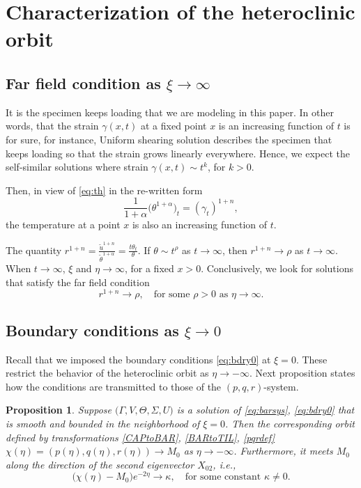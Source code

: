 \documentclass[a4paper,11pt]{article}
\def\tth{{\tilde{\theta}}}
\def\tu{{\tilde{u}}}
\newtheorem{proposition}{Proposition}[section]
\begin{document}
\section{Characterization of the heteroclinic orbit}

\subsection{Far field condition as $\xi \rightarrow \infty$} \label{sec:far}
It is the specimen keeps loading that we are modeling in this paper. In other words, that the strain $\gamma(x,t)$ at a fixed point $x$ is an increasing function of $t$ is for sure, for instance, Uniform shearing solution describes the specimen that keeps loading so that the strain grows linearly everywhere. Hence, we expect the self-similar solutions where strain $\gamma(x,t) \sim t^k$, for $k>0$.

Then, in view of \eqref{eq:th} in the re-written form
$$ \frac{1}{1+\alpha} \big(\theta^{1+\alpha}\big)_t = (\gamma_t)^{1+n}, $$
the temperature at a point $x$ is also an increasing function of $t$.

The quantity $\displaystyle r^{1+n} = \frac{\tu^{1+n}}{\tth^{1+\alpha}} = \frac{t\theta_t}{\theta}$. If $\theta \sim t^\rho$ as $t \rightarrow \infty$, then $r^{1+n} \rightarrow \rho$ as $t \rightarrow \infty$. When $t \rightarrow \infty$, $\xi$ and $\eta \rightarrow \infty$, for a fixed $x>0$. Conclusively, we look for solutions that satisfy the far field condition
\begin{equation}
    r^{1+n} \rightarrow \rho, \quad \text{for some $\rho>0$ as $\eta \rightarrow \infty$}. \label{eq:farcond}
\end{equation}

\subsection{Boundary conditions as $\xi \rightarrow 0$}
Recall that we imposed the boundary conditions \eqref{eq:bdry0} at $\xi=0$. These restrict the behavior of the heteroclinic orbit as $\eta \rightarrow -\infty$. Next proposition states how the conditions are transmitted to those of the $(p,q,r)$-system.

\begin{proposition} \label{prop1}
    Suppose $\big(\Gamma,V,\Theta,\Sigma,U\big)$ is a solution of \eqref{eq:barsys}, \eqref{eq:bdry0} that is smooth and bounded in the neighborhood of $\xi=0$. Then the corresponding orbit defined by transformations \eqref{CAPtoBAR}, \eqref{BARtoTIL}, \eqref{pqrdef} $\chi(\eta) = (p(\eta), q(\eta), r(\eta)) \rightarrow M_0$ as $\eta \rightarrow -\infty$. Furthermore, it meets $M_0$ along the direction of the second eigenvector $X_{02}$, i.e.,
    \begin{equation} \label{eq:alpha}
     \big(\chi(\eta) - M_0 \big)e^{-2\eta} \rightarrow \kappa, \quad \text{for some constant $\kappa\ne0$.}
    \end{equation}
\end{proposition}
\end{document}

